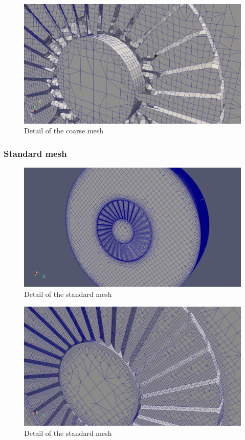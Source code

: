 \begin{figure}[h!]
\includegraphics[scale=0.26]{./mesh/screenshots/coarse3}
\centering
\caption{Detail of the coarse mesh}
\end{figure}

\subsubsection{Standard mesh}

\begin{figure}[h!]
\includegraphics[scale=0.26]{./mesh/screenshots/std2}
\centering
\caption{Detail of the standard mesh}
\end{figure}

\begin{figure}[h!]
\includegraphics[scale=0.26]{./mesh/screenshots/std3}
\centering
\caption{Detail of the standard mesh}
\end{figure}

